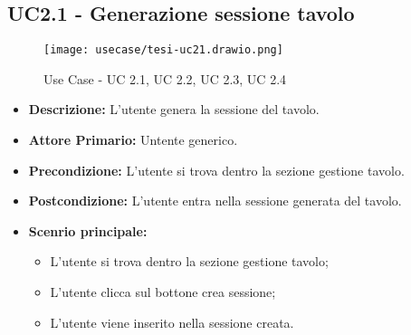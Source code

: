 \subsection{UC2.1 - Generazione sessione tavolo}
\begin{figure}[H]
    \centering
    \texttt{[image: usecase/tesi-uc21.drawio.png]}
    \caption{Use Case - UC 2.1, UC 2.2, UC 2.3, UC 2.4}
\end{figure}
\begin{itemize}
    \item \textbf{Descrizione:} L'utente genera la sessione del tavolo.
    \item \textbf{Attore Primario:} Untente generico.
    \item \textbf{Precondizione:} L'utente si trova dentro la sezione gestione tavolo.
    \item \textbf{Postcondizione:} L'utente entra nella sessione generata del tavolo.
    \item \textbf{Scenrio principale:}
    \begin{itemize}
        \item L'utente si trova dentro la sezione gestione tavolo;
        \item L'utente clicca sul bottone crea sessione;
        \item L'utente viene inserito nella sessione creata.
    \end{itemize}
\end{itemize}
